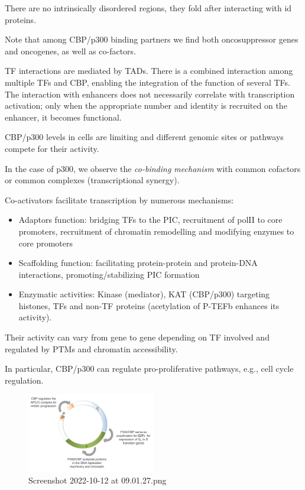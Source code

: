 There are no intrinsically disordered regions, they fold after interacting with id proteins.

Note that among CBP/p300 binding partners we find both oncosuppressor genes and oncogenes, as well as co-factors.

TF interactions are mediated by TADs. There is a combined interaction among multiple TFs and CBP, enabling the integration of the function of several TFs. The interaction with enhancers does not necessarily correlate with transcription activation; only when the appropriate number and identity is recruited on the enhancer, it becomes functional.

CBP/p300 levels in cells are limiting and different genomic sites or pathways compete for their activity.

In the case of p300, we observe the \emph{co-binding mechanism} with common cofactors or common complexes (transcriptional synergy).

Co-activators facilitate transcription by numerous mechanisms:

\begin{itemize}
\tightlist
\item
  Adaptors function: bridging TFs to the PIC, recruitment of polII to core promoters, recruitment of chromatin remodelling and modifying enzymes to core promoters
\item
  Scaffolding function: facilitating protein-protein and protein-DNA interactions, promoting/stabilizing PIC formation
\item
  Enzymatic activities: Kinase (mediator), KAT (CBP/p300) targeting histones, TFs and non-TF proteins (acetylation of P-TEFb enhances its activity).
\end{itemize}

Their activity can vary from gene to gene depending on TF involved and regulated by PTMs and chromatin accessibility.

In particular, CBP/p300 can regulate pro-proliferative pathways, e.g., cell cycle regulation.

\begin{figure}
\centering
\includegraphics[width=0.5\textwidth]{../_resources/Screenshot_2022-10-12_at_09-01-27.png}
\caption{Screenshot 2022-10-12 at 09.01.27.png}
\end{figure}

